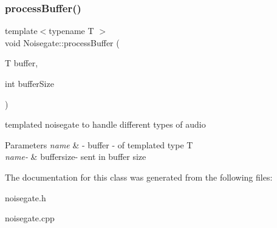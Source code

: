 \subsubsection{\texorpdfstring{process\+Buffer()}{processBuffer()}}
{\footnotesize\ttfamily template$<$typename T $>$ \\
void Noisegate\+::process\+Buffer (\begin{DoxyParamCaption}\item[{T}]{buffer,  }\item[{int}]{buffer\+Size }\end{DoxyParamCaption})\hspace{0.3cm}{\ttfamily [inline]}}

templated noisegate to handle different types of audio 
\begin{DoxyParams}{Parameters}
{\em name} & -\/ buffer -\/ of templated type T \\
\hline
{\em name-\/} & buffersize-\/ sent in buffer size \\
\hline
\end{DoxyParams}


The documentation for this class was generated from the following files\+:\begin{DoxyCompactItemize}
\item 
noisegate.\+h\item 
noisegate.\+cpp\end{DoxyCompactItemize}
